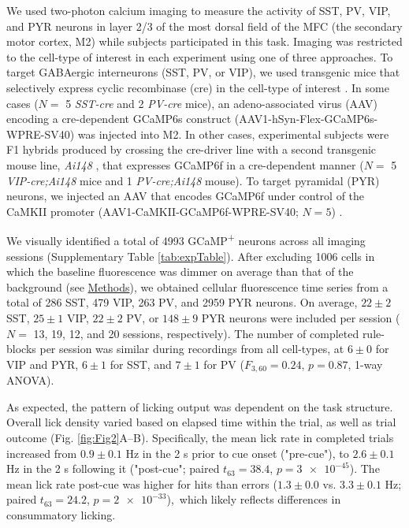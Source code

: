 We used two-photon calcium imaging to measure the activity of SST, PV, VIP, and PYR neurons in layer 2/3 of the most dorsal field of the MFC (the secondary motor cortex, M2) while subjects participated in this task. Imaging was restricted to the cell-type of interest in each experiment using one of three approaches. To target GABAergic interneurons (SST, PV, or VIP), we used transgenic mice that selectively express cyclic recombinase (cre) in the cell-type of interest \citep{taniguchi11}. In some cases ($N =$ 5 \emph{SST-cre} and 2 \emph{PV-cre} mice), an adeno-associated virus (AAV) encoding a cre-dependent GCaMP6s construct (AAV1-hSyn-Flex-GCaMP6s-WPRE-SV40) was injected into M2. In other cases, experimental subjects were F1 hybrids produced by crossing the cre-driver line with a second transgenic mouse line, \emph{Ai148} \citep{daigle18}, that expresses GCaMP6f in a cre-dependent manner ($N =$ 5 \emph{VIP-cre;Ai148} mice and 1 \emph{PV-cre;Ai148} mouse). To target pyramidal (PYR) neurons, we injected an AAV that encodes GCaMP6f under control of the CaMKII promoter (AAV1-CaMKII-GCaMP6f-WPRE-SV40; $N = 5$) \citep{kuchibhotla17, ali20}.

We visually identified a total of \num{4993} GCaMP\textsuperscript{+} neurons across all imaging sessions (Supplementary Table \ref{tab:expTable}). After excluding \num{1006} cells in which the baseline fluorescence was dimmer on average than that of the background (see \hyperlink{methods_dFF}{Methods}), we obtained cellular fluorescence time series from a total of 286 SST, 479 VIP, 263 PV, and \num{2959} PYR neurons. On average, $22 \pm 2$ SST, $25 \pm 1$ VIP, $22 \pm 2$ PV, or $148 \pm 9$ PYR neurons were included per session ($N =$ 13, 19, 12, and 20 sessions, respectively). The number of completed rule-blocks per session was similar during recordings from all cell-types, at $6 \pm 0$ for VIP and PYR, $6 \pm 1$ for SST, and $7 \pm 1$ for PV ($F_{3,60}=0.24$, $p=0.87$, 1-way ANOVA). 

As expected, the pattern of licking output was dependent on the task structure. Overall lick density varied based on elapsed time within the trial, as well as trial outcome (Fig. \ref{fig:Fig2}A--B). Specifically, the mean lick rate in completed trials increased from $0.9 \pm 0.1$ Hz in the 2 s prior to cue onset ("pre-cue"), to $2.6 \pm 0.1$ Hz in the 2 s following it ("post-cue"; paired $t_{63} =38.4$, $p=\num{3e-45}$). The mean lick rate post-cue was higher for hits than errors ($1.3 \pm 0.0$ vs. $3.3 \pm 0.1$ Hz; paired $t_{63} =24.2$, $p=\num{2e-33}$),\ which likely reflects differences in consummatory licking.

